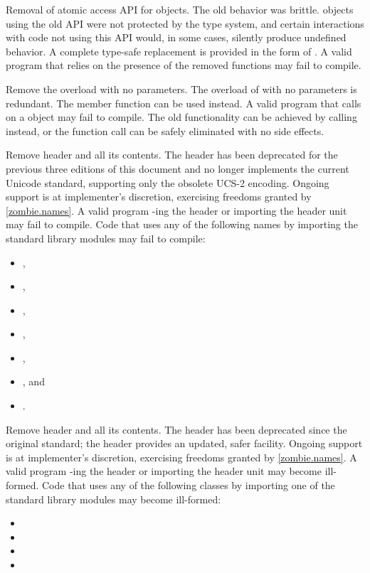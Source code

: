 \nodiffref
\change
Removal of atomic access API for  objects.
\rationale
The old behavior was brittle.  objects using the old API were
not protected by the type system, and certain interactions with code not using
this API would, in some cases, silently produce undefined behavior. A complete
type-safe replacement is provided in the form of .
\effect
A valid \CppXXIII{} program that relies on the presence of the removed functions
may fail to compile.

\nodiffref
\change
Remove the  overload with no parameters.
\rationale
The overload of  with no parameters is redundant.
The  member function can be used instead.
\effect
A valid \CppXXIII{} program that calls 
on a  object may fail to compile.
The old functionality can be achieved by calling  instead,
or the function call can be safely eliminated with no side effects.

\nodiffref
\change
Remove header  and all its contents.
\rationale
The header has been deprecated for the previous three editions of this document
and no longer implements the current Unicode standard, supporting only the
obsolete UCS-2 encoding.
Ongoing support is at implementer's discretion,
exercising freedoms granted by \ref{zombie.names}.
\effect
A valid \CppXXIII{} program -ing the header or importing the
header unit may fail to compile. Code that uses any of the following names by
importing the standard library modules may fail to compile:
\begin{itemize}
\item {},
\item {},
\item {},
\item {},
\item {},
\item {}, and
\item {}.
\end{itemize}

\nodiffref
\change
Remove header  and all its contents.
\rationale
The header has been deprecated since the original \Cpp{} standard; the
 header provides an updated, safer facility.
Ongoing support is at implementer's discretion,
exercising freedoms granted by \ref{zombie.names}.
\effect
A valid \CppXXIII{} program -ing the header or importing the
header unit may become ill-formed. Code that uses any of the following classes
by importing one of the standard library modules may become ill-formed:
\begin{itemize}
\item {}
\item {}
\item {}
\item {}
\end{itemize}

